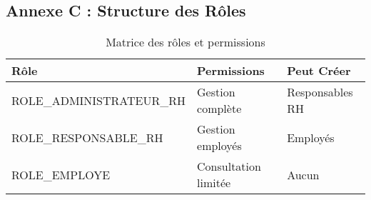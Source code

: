 \documentclass[12pt,a4paper]{article}
\begin{document}
\subsection{Annexe C : Structure des Rôles}

\begin{table}[H]
\centering
\begin{tabular}{|l|l|l|}
\hline
\textbf{Rôle} & \textbf{Permissions} & \textbf{Peut Créer} \\
\hline
ROLE\_ADMINISTRATEUR\_RH & Gestion complète & Responsables RH \\
\hline
ROLE\_RESPONSABLE\_RH & Gestion employés & Employés \\
\hline
ROLE\_EMPLOYE & Consultation limitée & Aucun \\
\hline
\end{tabular}
\caption{Matrice des rôles et permissions}
\label{tab:matrice_roles}
\end{table}
\end{document}
